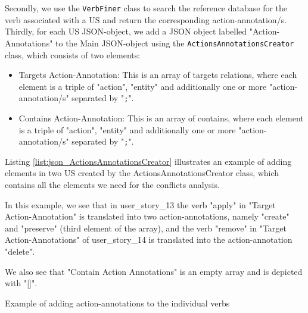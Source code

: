 Secondly, we use the \texttt{VerbFiner} class to search the reference database for the verb associated with a US and return the corresponding action-annotation/s. Thirdly, for each US JSON-object, we add a JSON object labelled "Action-Annotations" to the Main JSON-object using the \texttt{ActionsAnnotationsCreator} class, which consists of two elements:
\begin{itemize}
	\item Targets Action-Annotation: This is an array of targets relations, where each element is a triple of "action", "entity" and additionally one or more "action-annotation/s" separated by "\texttt{;}".
	
	\item Contains Action-Annotation: This is an array of contains, where each element is a triple of "action", "entity" and additionally one or more "action-annotation/s" separated by "\texttt{;}".
\end{itemize}
\begin{example}
Listing \ref{list:json_ActionsAnnotationsCreator} illustrates an example of adding elements in two US created by the ActionsAnnotationsCreator class, which contains all the elements we need for the conflicts analysis.

In this example, we see that in user\_story\_13 the verb "apply" in "Target Action-Annotation" is translated into two action-annotations, namely "create" and "preserve" (third element of the array), and the verb "remove" in "Target Action-Annotations" of user\_story\_14 is translated into the action-annotation "delete".

We also see that "Contain Action Annotations" is an empty array and is depicted with "[]".
\end{example}
\begin{MyListing}
	\centering
	
	\caption{Example of adding action-annotations to the individual verbs}\label{list:json_ActionsAnnotationsCreator}
	\end{MyListing}

